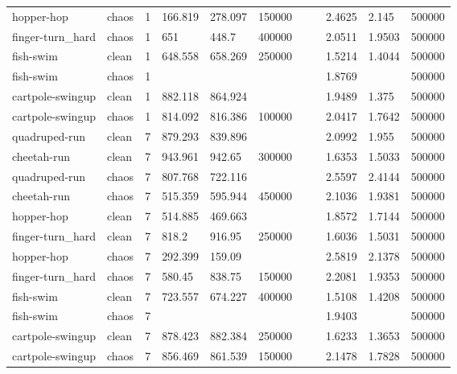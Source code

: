 \begin{tabular}{lllllllllll}
hopper-hop & chaos & 1 & 166.819 & 278.097 & 150000 &  &  & 2.4625 & 2.145 & 500000 \\
finger-turn\_hard & chaos & 1 & 651 & 448.7 & 400000 &  &  & 2.0511 & 1.9503 & 500000 \\
fish-swim & clean & 1 & 648.558 & 658.269 & 250000 &  &  & 1.5214 & 1.4044 & 500000 \\
fish-swim & chaos & 1 &  &  &  &  &  & 1.8769 &  & 500000 \\
cartpole-swingup & clean & 1 & 882.118 & 864.924 &  &  &  & 1.9489 & 1.375 & 500000 \\
cartpole-swingup & chaos & 1 & 814.092 & 816.386 & 100000 &  &  & 2.0417 & 1.7642 & 500000 \\
quadruped-run & clean & 7 & 879.293 & 839.896 &  &  &  & 2.0992 & 1.955 & 500000 \\
cheetah-run & clean & 7 & 943.961 & 942.65 & 300000 &  &  & 1.6353 & 1.5033 & 500000 \\
quadruped-run & chaos & 7 & 807.768 & 722.116 &  &  &  & 2.5597 & 2.4144 & 500000 \\
cheetah-run & chaos & 7 & 515.359 & 595.944 & 450000 &  &  & 2.1036 & 1.9381 & 500000 \\
hopper-hop & clean & 7 & 514.885 & 469.663 &  &  &  & 1.8572 & 1.7144 & 500000 \\
finger-turn\_hard & clean & 7 & 818.2 & 916.95 & 250000 &  &  & 1.6036 & 1.5031 & 500000 \\
hopper-hop & chaos & 7 & 292.399 & 159.09 &  &  &  & 2.5819 & 2.1378 & 500000 \\
finger-turn\_hard & chaos & 7 & 580.45 & 838.75 & 150000 &  &  & 2.2081 & 1.9353 & 500000 \\
fish-swim & clean & 7 & 723.557 & 674.227 & 400000 &  &  & 1.5108 & 1.4208 & 500000 \\
fish-swim & chaos & 7 &  &  &  &  &  & 1.9403 &  & 500000 \\
cartpole-swingup & clean & 7 & 878.423 & 882.384 & 250000 &  &  & 1.6233 & 1.3653 & 500000 \\
cartpole-swingup & chaos & 7 & 856.469 & 861.539 & 150000 &  &  & 2.1478 & 1.7828 & 500000 \\
\bottomrule
\end{tabular}
